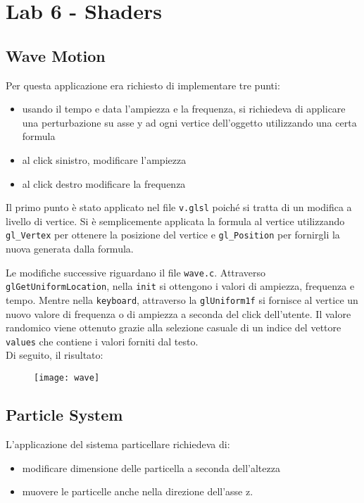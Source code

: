 \chapter*{Lab 6 - Shaders}

\section{Wave Motion}
Per questa applicazione era richiesto di implementare tre punti:
\begin{itemize}
  \item usando il tempo e data l'ampiezza e la frequenza, si richiedeva di applicare una perturbazione su asse y ad ogni vertice dell'oggetto utilizzando una certa formula
  \item al click sinistro, modificare l'ampiezza
  \item al click destro modificare la frequenza
\end{itemize}
Il primo punto è stato applicato nel file \texttt{v.glsl} poiché si tratta di un modifica a livello di vertice. Si è semplicemente applicata la formula al vertice utilizzando \texttt{gl\_Vertex} per ottenere la posizione del vertice e \texttt{gl\_Position} per fornirgli la nuova generata dalla formula.

Le modifiche successive riguardano il file \texttt{wave.c}. Attraverso \texttt{glGetUniformLocation}, nella \texttt{init} si ottengono i valori di ampiezza, frequenza e tempo. Mentre nella \texttt{keyboard}, attraverso la \texttt{glUniform1f} si fornisce al vertice un nuovo valore di frequenza o di ampiezza a seconda del click dell'utente. Il valore randomico viene ottenuto grazie alla selezione casuale di un indice del vettore \texttt{values} che contiene i valori forniti dal testo.\\
Di seguito, il risultato:
 \begin{figure}[htb]
    \centering
    \texttt{[image: wave]}
    \caption{\label{fig:wave}}
\end{figure}
 
\section{Particle System}
L'applicazione del sistema particellare richiedeva di:
\begin{itemize}
  \item modificare dimensione delle particella a seconda dell'altezza
  \item muovere le particelle anche nella direzione dell'asse z.
\end{itemize}


